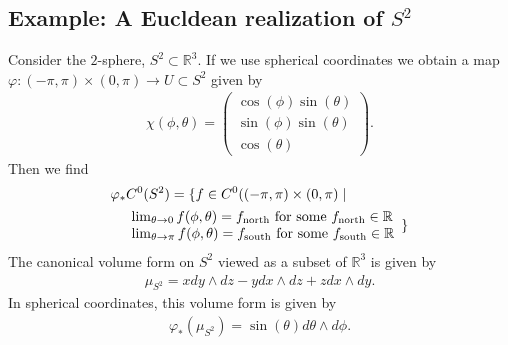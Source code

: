 \documentclass[a4paper, 12 pt]{amsart}
\newcommand{\R}{\mathbb{R}}
\begin{document}
  
  \subsection{Example: A Eucldean realization of $S^2$}
  Consider the $2$-sphere, $S^2 \subset \R^3$.
  If we use spherical coordinates we obtain a map
  $\varphi: (-\pi,\pi) \times (0,\pi) \to U \subset S^2$
  given by
  \begin{align*}
    \chi(\phi,\theta) = \begin{pmatrix}
      \cos(\phi) \sin(\theta) \\
      \sin(\phi) \sin(\theta) \\
      \cos(\theta)
      \end{pmatrix}.
  \end{align*}
  Then we find
  \begin{align*}
    &\varphi_*C^0(S^2) = \{
      f \in C^0( (-\pi,\pi)\times (0,\pi) \mid \\
    &\quad \begin{array}{l}
      \lim_{\theta \to 0} f(\phi,\theta) = f_{\rm north} \text{ for some } f_{\rm north} \in \R \\
      \lim_{\theta \to \pi} f(\phi,\theta) = f_{\rm south} \text{ for some } f_{\rm south} \in \R 
    \end{array}
    \}
  \end{align*}
  The canonical volume form on $S^2$ viewed as a subset of $\R^3$ is 
  given by
  \begin{align*}
    \mu_{S^2} = x dy \wedge dz - y dx \wedge dz + z dx \wedge dy.
  \end{align*}
  In spherical coordinates, this volume form is given by
  \begin{align*}
    \varphi_*(\mu_{S^2}) = \sin(\theta) d\theta \wedge d\phi.
  \end{align*}
\end{document}

